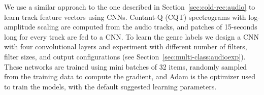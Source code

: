 We use a similar approach to the one described in Section~\ref{sec:cold-rec:audio} to learn track feature vectors using CNNs. Contant-Q (CQT) spectrograms with log-amplitude scaling are computed from the audio tracks, and patches of 15-seconds long for every track are fed to a CNN.
To learn the genre labels we design a CNN with four convolutional layers and experiment with different number of filters, filter sizes, and output configurations (see Section~\ref{sec:multi-class:audioexp}).
These networks are trained using mini batches of 32 items, randomly sampled from the training data to compute the gradient, and Adam \citep{KingmaB14} is the optimizer used to train the models, with the default suggested learning parameters.








